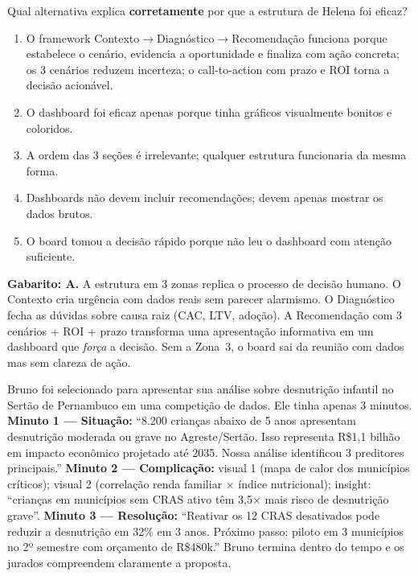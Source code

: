 \begin{SolvedBox}[title=Questão 4 --- Prova II Unidade (2{,}0 pts) --- Dashboard Decisório]
Qual alternativa explica \textbf{corretamente} por que a estrutura de Helena foi eficaz?
\begin{enumerate}[label=\Alph*)]
  \item O framework Contexto$\to$Diagnóstico$\to$Recomendação funciona porque estabelece o cenário, evidencia a oportunidade e finaliza com ação concreta; os 3 cenários reduzem incerteza; o call-to-action com prazo e ROI torna a decisão acionável.
  \item O dashboard foi eficaz apenas porque tinha gráficos visualmente bonitos e coloridos.
  \item A ordem das 3 seções é irrelevante; qualquer estrutura funcionaria da mesma forma.
  \item Dashboards não devem incluir recomendações; devem apenas mostrar os dados brutos.
  \item O board tomou a decisão rápido porque não leu o dashboard com atenção suficiente.
\end{enumerate}
\end{SolvedBox}

\textbf{Gabarito: A.} A estrutura em 3 zonas replica o processo de decisão humano. O Contexto cria urgência com dados reais sem parecer alarmismo. O Diagnóstico fecha as dúvidas sobre causa raiz (CAC, LTV, adoção). A Recomendação com 3 cenários + ROI + prazo transforma uma apresentação informativa em um dashboard que \emph{força} a decisão. Sem a Zona~3, o board sai da reunião com dados mas sem clareza de ação.

\medskip

Bruno foi selecionado para apresentar sua análise sobre desnutrição infantil no Sertão de Pernambuco em uma competição de dados. Ele tinha apenas 3 minutos. \textbf{Minuto 1 --- Situação:} ``8.200 crianças abaixo de 5 anos apresentam desnutrição moderada ou grave no Agreste/Sertão. Isso representa R\$1,1 bilhão em impacto econômico projetado até 2035. Nossa análise identificou 3 preditores principais.'' \textbf{Minuto 2 --- Complicação:} visual 1 (mapa de calor dos municípios críticos); visual 2 (correlação renda familiar $\times$ índice nutricional); insight: ``crianças em municípios sem CRAS ativo têm 3,5$\times$ mais risco de desnutrição grave''. \textbf{Minuto 3 --- Resolução:} ``Reativar os 12 CRAS desativados pode reduzir a desnutrição em 32\% em 3 anos. Próximo passo: piloto em 3 municípios no 2º semestre com orçamento de R\$480k.'' Bruno termina dentro do tempo e os jurados compreendem claramente a proposta.

